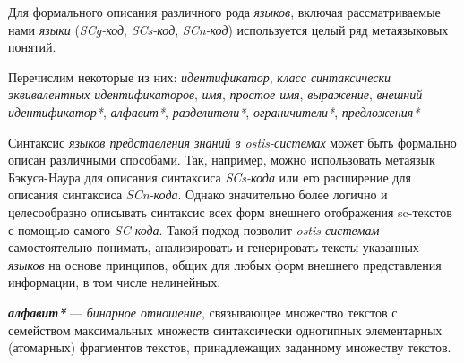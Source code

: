 \begin{SCn}


    \begin{scnindent}
    \end{scnindent}

\end{SCn}

Для формального описания различного рода \textit{языков}, включая рассматриваемые нами \textit{языки} (\textit{SCg-код}, \textit{SCs-код}, \textit{SCn-код}) используется целый ряд метаязыковых понятий.

Перечислим некоторые из них: \textit{идентификатор}, \textit{класс синтаксически эквивалентных идентификаторов}, \textit{имя}, \textit{простое имя}, \textit{выражение}, \textit{внешний идентификатор*}, \textit{алфавит*}, \textit{разделители*}, \textit{ограничители*}, \textit{предложения*}

Синтаксис \textit{языков представления знаний в ostis-системах} может быть формально описан различными способами.
Так, например, можно использовать метаязык Бэкуса-Наура для описания синтаксиса \textit{SCs-кода} или его расширение для описания синтаксиса \textit{SCn-кода}.
Однако значительно более логично и целесообразно описывать синтаксис всех форм внешнего отображения sc-текстов с помощью самого \textit{SC-кода}.
Такой подход позволит \textit{ostis-системам} самостоятельно понимать, анализировать и генерировать тексты указанных \textit{языков} на основе принципов, общих для любых форм внешнего представления информации, в том числе нелинейных.

\textit{\textbf{алфавит*}} --- \textit{бинарное отношение}, связывающее множество текстов с  семейством максимальных множеств синтаксически однотипных элементарных (атомарных) фрагментов текстов, принадлежащих заданному множеству текстов.



